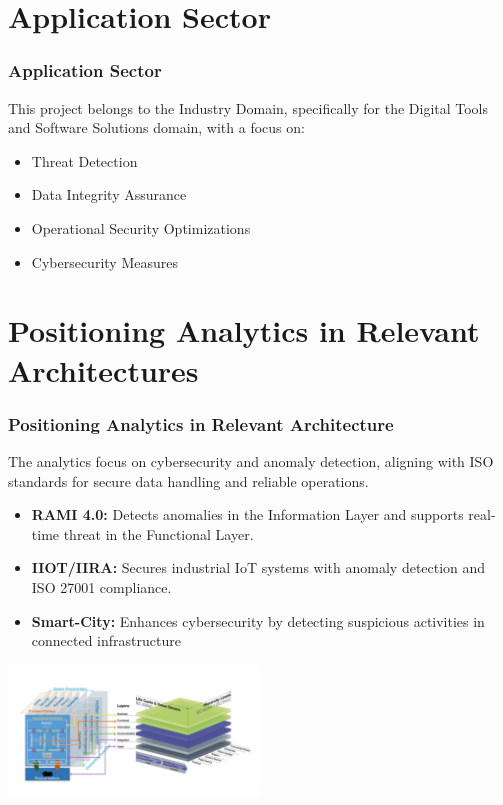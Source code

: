 \documentclass[10pt, a4paper]{beamer}
\begin{document}
\section{Application Sector}
\begin{frame}
	\frametitle{Application Sector}
	This project belongs to the Industry Domain, specifically for the Digital Tools and Software Solutions domain, with a focus on:
	
	\begin{block}{}
		\begin{itemize}
			\item Threat Detection
			\item Data Integrity Assurance
			\item Operational Security Optimizations
			\item Cybersecurity Measures
		\end{itemize}
	\end{block}
\end{frame}

\section{Positioning Analytics in Relevant Architectures}
\begin{frame}
	\frametitle{Positioning Analytics in Relevant Architecture}
The analytics focus on cybersecurity and anomaly detection, aligning with ISO standards for secure data handling and reliable operations.

	
	\begin{block}{}
		\begin{itemize}
			\item \textbf{RAMI 4.0:} Detects anomalies in the Information Layer and supports real-time threat in the Functional Layer.
			\item \textbf{IIOT/IIRA:} Secures industrial IoT systems with anomaly detection and ISO 27001 compliance.
			\item \textbf{Smart-City:} Enhances cybersecurity by detecting suspicious activities in connected infrastructure
		\end{itemize}
	\end{block}
	
	\centering
	\includegraphics[width=0.5\textwidth]{images/RAMI_IIRA.png} %
	
	\centering
	
	
\end{frame}
\end{document}
